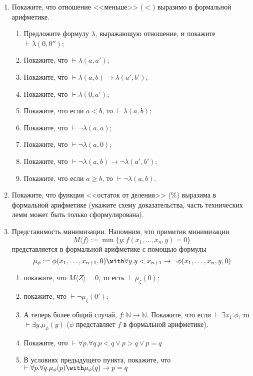 \documentclass[10pt,a4paper,oneside]{article}
\begin{document}
\begin{enumerate}
\item Покажите, что отношение <<меньше>> ($<$) выразимо в формальной арифметике.
\begin{enumerate}
\item Предложите формулу $\lambda$, выражающую отношение, и покажите $\vdash\lambda(0,0'')$;
\item Покажите, что $\vdash \lambda(a,a')$;
\item Покажите, что $\vdash \lambda(a,b)\rightarrow\lambda(a',b')$;
\item Покажите, что $\vdash \lambda(0,a')$;
\item Покажите, что если $a < b$, то $\vdash \lambda(a,b)$;
\item Покажите, что $\vdash \neg\lambda (a,a)$;
\item Покажите, что $\vdash \neg\lambda (a,0)$;
\item Покажите, что $\vdash \neg\lambda (a,b)\rightarrow\neg\lambda(a',b')$;
\item Покажите, что если $a \ge b$, то $\vdash \neg\lambda (a,b)$.
\end{enumerate}

\item Покажите, что функция <<остаток от деления>> ($\%$) выразима в формальной арифметике
(укажите схему доказательства, часть технических лемм может быть только сформулирована).

\item Представимость минимизации. Напомним, что примитив минимизации
$$M\langle f \rangle := \min\{y: f(x_1,\dots,x_n,y) = 0\}$$
представляется в формальной арифметике с помощью формулы
$$\mu_\phi := \phi(x_1,\dots,x_{n+1},0) \with \forall y.y < x_{n+1} \rightarrow \neg\phi(x_1,\dots,x_n,y,0)$$

\begin{enumerate}
\item покажите, что $M\langle Z\rangle = 0$, то есть $\vdash\mu_\zeta(0)$;
\item покажите, что $\vdash\neg\mu_\zeta(0')$;
\item
А теперь более общий случай, $f: \mathbb{N}\rightarrow\mathbb{N}$.
Покажите, что если $\vdash\exists x_1.\phi$, то $\vdash\exists y.\mu_\phi(y)$
($\phi$ представляет $f$ в формальной арифметике).
\item Покажите, что $\vdash \forall p.\forall q.p < q \vee p > q \vee p=q$
\item В условиях предыдущего пункта, покажите, что 
$\vdash\forall p.\forall q.\mu_\phi(p)\with\mu_\phi(q)\rightarrow p=q$
\end{enumerate}
\end{enumerate}
\end{document}
